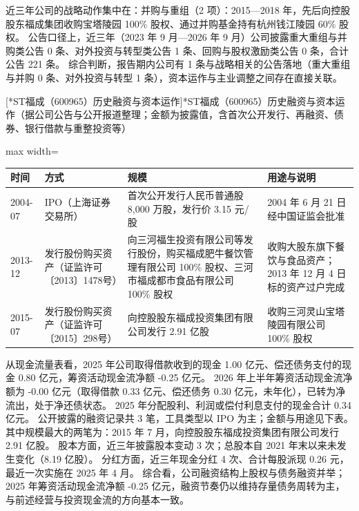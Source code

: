  近三年公司的战略动作集中在：并购与重组（2 项）：2015---2018 年，先后向控股股东福成集团收购宝塔陵园 100\% 股权、通过并购基金持有杭州钱江陵园 60\% 股权。 公告口径上，近三年（2023 年 9 月---2026 年 9 月）公司披露重大重组与并购类公告 0 条、对外投资与转型类公告 1 条、回购与股权激励类公告 0 条，合计公告 221 条。 综合判断，报告期内公司有 1 条与战略相关的公告落地（重大重组与并购 0 条、对外投资与转型 1 条），资本运作与主业调整之间存在直接关联。

\begin{center}\small\setlength{\tabcolsep}{4pt}
[*ST福成（600965）历史融资与资本运作]{*ST福成（600965）历史融资与资本运作（据公司公告与公开报道整理；金额为披露值，含首次公开发行、再融资、债券、银行借款与重整投资等）}
\begin{adjustbox}{max width=\textwidth}
\begin{tabular}{@{}p{1.45cm}p{2.55cm}p{4.05cm}p{4.95cm}@{}}
\toprule
时间 & 方式 & 规模 & 用途与说明 \\
\midrule
2004-07 & IPO（上海证券交易所） & 首次公开发行人民币普通股 8,\allowbreak{}000 万股，\allowbreak{}发行价 3.15 元/\allowbreak{}股 & 2004 年 6 月 21 日经中国证监会批准 \\
2013-12 & 发行股份购买资产（证监许可〔2013〕1478号） & 向三河福生投资有限公司等发行股份，\allowbreak{}购买福成肥牛餐饮管理有限公司 100\% 股权、\allowbreak{}三河市福成都市食品有限公司 100\% 股权 & 收购大股东旗下餐饮与食品资产；2013 年 12 月 4 日标的资产过户完成 \\
2015-07 & 发行股份购买资产（证监许可〔2015〕298号） & 向控股股东福成投资集团有限公司发行 2.91 亿股 & 收购三河灵山宝塔陵园有限公司 100\% 股权 \\
\bottomrule
\end{tabular}
\end{adjustbox}
\end{center}

 从现金流量表看，2025 年公司取得借款收到的现金 1.00 亿元、偿还债务支付的现金 0.80 亿元，筹资活动现金流净额 -0.25 亿元。 2026 年上半年筹资活动现金流净额为 -0.00 亿元（取得借款 0.33 亿元、偿还债务 0.30 亿元，未年化），已转为净流出，处于净还债状态。 2025 年分配股利、利润或偿付利息支付的现金合计 0.34 亿元。 公开披露的融资记录共 3 笔，工具类型以 IPO 为主；金额与用途见下表。 其中规模最大的两笔为：2015 年 7 月，向控股股东福成投资集团有限公司发行 2.91 亿股。 股本方面，近三年披露股本变动 3 次；总股本自 2021 年末以来未发生变化（8.19 亿股）。 分红方面，近三年现金分红 4 次、合计每股派现 0.26 元，最近一次实施在 2025 年 4 月。 综合看，公司融资结构上股权与债务融资并举；2025 年筹资活动现金流净额 -0.25 亿元，融资节奏仍以维持存量债务周转为主，与前述经营与投资现金流的方向基本一致。

